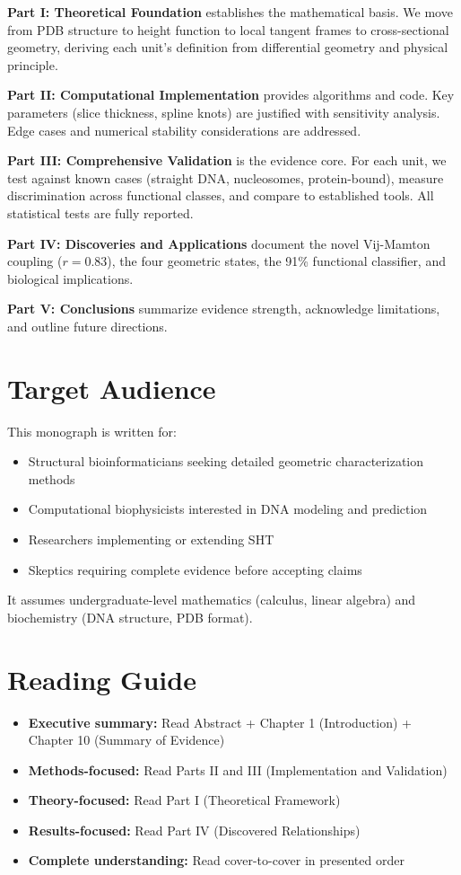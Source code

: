 \textbf{Part I: Theoretical Foundation} establishes the mathematical basis. We move from PDB structure to height function to local tangent frames to cross-sectional geometry, deriving each unit's definition from differential geometry and physical principle.

\textbf{Part II: Computational Implementation} provides algorithms and code. Key parameters (slice thickness, spline knots) are justified with sensitivity analysis. Edge cases and numerical stability considerations are addressed.

\textbf{Part III: Comprehensive Validation} is the evidence core. For each unit, we test against known cases (straight DNA, nucleosomes, protein-bound), measure discrimination across functional classes, and compare to established tools. All statistical tests are fully reported.

\textbf{Part IV: Discoveries and Applications} document the novel Vij-Mamton coupling ($r = 0.83$), the four geometric states, the 91\% functional classifier, and biological implications.

\textbf{Part V: Conclusions} summarize evidence strength, acknowledge limitations, and outline future directions.

\section*{Target Audience}

This monograph is written for:
\begin{itemize}
    \item Structural bioinformaticians seeking detailed geometric characterization methods
    \item Computational biophysicists interested in DNA modeling and prediction
    \item Researchers implementing or extending SHT
    \item Skeptics requiring complete evidence before accepting claims
\end{itemize}

It assumes undergraduate-level mathematics (calculus, linear algebra) and biochemistry (DNA structure, PDB format).

\section*{Reading Guide}

\begin{itemize}
    \item \textbf{Executive summary:} Read Abstract + Chapter 1 (Introduction) + Chapter 10 (Summary of Evidence)
    \item \textbf{Methods-focused:} Read Parts II and III (Implementation and Validation)
    \item \textbf{Theory-focused:} Read Part I (Theoretical Framework)
    \item \textbf{Results-focused:} Read Part IV (Discovered Relationships)
    \item \textbf{Complete understanding:} Read cover-to-cover in presented order
\end{itemize}

